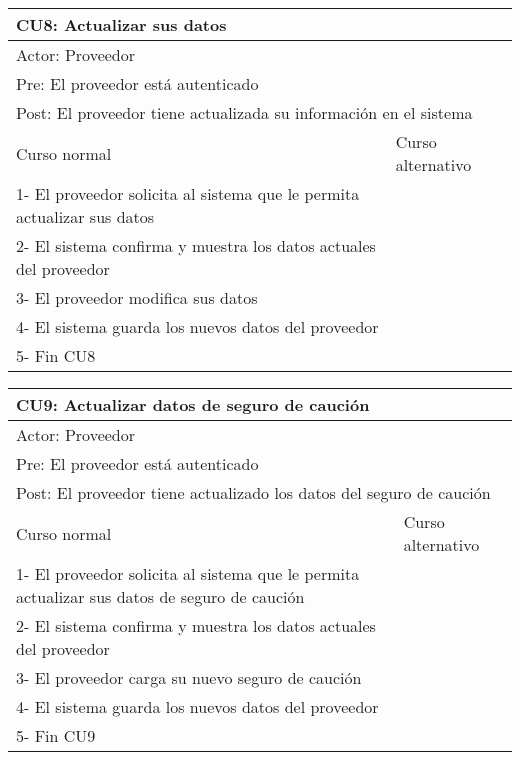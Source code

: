 \begin{table}[H]
  \begin{adjustbox}{max width = \textwidth}
  \begin{tabular}{|l|l|}
    \hline
    \multicolumn{2}{|l|}{CU8: Actualizar sus datos} \\\hline
    \multicolumn{2}{|l|}{Actor: Proveedor} \\\hline
    \multicolumn{2}{|l|}{Pre: El proveedor está autenticado} \\\hline
    \multicolumn{2}{|l|}{Post: El proveedor tiene actualizada su información en el sistema} \\\hline
     Curso normal & Curso alternativo\\ \hline
     1- El proveedor solicita al sistema que le permita actualizar sus datos & \\ \hline
     2- El sistema confirma y muestra los datos actuales del proveedor & \\ \hline
     3- El proveedor modifica sus datos &\\ \hline
     4- El sistema guarda los nuevos datos del proveedor & \\ \hline
     5- Fin CU8 & \\ \hline
  \end{tabular}
  \end{adjustbox}
\end{table}

\begin{table}[H]
  \begin{adjustbox}{max width = \textwidth}
  \begin{tabular}{|l|l|}
    \hline
    \multicolumn{2}{|l|}{CU9: Actualizar datos de seguro de caución} \\\hline
    \multicolumn{2}{|l|}{Actor: Proveedor} \\\hline
    \multicolumn{2}{|l|}{Pre: El proveedor está autenticado} \\\hline
    \multicolumn{2}{|l|}{Post: El proveedor tiene actualizado los datos del seguro de caución} \\\hline
     Curso normal & Curso alternativo\\ \hline
     1- El proveedor solicita al sistema que le permita actualizar sus datos de seguro de caución & \\ \hline
     2- El sistema confirma y muestra los datos actuales del proveedor & \\ \hline
     3- El proveedor carga su nuevo seguro de caución &\\ \hline
     4- El sistema guarda los nuevos datos del proveedor & \\ \hline
     5- Fin CU9 & \\ \hline
  \end{tabular}
  \end{adjustbox}
\end{table}

